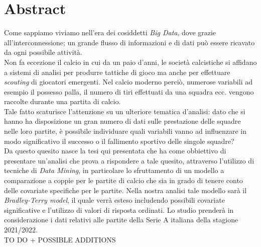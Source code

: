 
\cleardoublepage
{}
{}
\begingroup
\let\clearpage\relax
\let\cleardoublepage\relax
\let\cleardoublepage\relax

\chapter*{Abstract}

Come sappiamo viviamo nell'era dei cosiddetti \emph{Big Data}, dove grazie all'interconnessione; un grande flusso di informazioni e di dati può essere ricavato da ogni possibile attività. \\
Non fa eccezione il calcio in cui da un paio d'anni, le società calcistiche si affidano a sistemi di analisi per produrre tattiche di gioco ma anche per effettuare \textit{scouting} di giocatori emergenti. Nel calcio moderno perciò, numerose variabili ad esempio il possesso palla, il numero di tiri effettuati da una squadra ecc. vengono raccolte durante una partita di calcio.\\
Tale fatto scaturisce l'attenzione su un ulteriore tematica d'analisi: dato che si hanno ha disposizione un gran numero di dati sulle prestazione delle squadre nelle loro partite, è possibile individuare quali variabili vanno ad influenzare in modo significativo il successo o il fallimento sportivo delle singole squadre?\\
Da questo quesito nasce la tesi qui presentata che ha come obbiettivo di presentare un'analisi che prova a rispondere a tale quesito, attraverso l'utilizzo di tecniche di \textit{Data Mining}, in particolare lo sfruttamento di un modello a comparazione a coppie per le partite di calcio che sia in grado di tenere conto delle covariate specifiche per le partite. Nella nostra analisi tale modello sarà il \emph{Bradley-Terry model}, il quale verrà esteso includendo possibili covariate significative e l'utilizzo di valori di risposta ordinati. Lo studio prenderà in considerazione i dati relativi alle partite della Serie A italiana della stagione 2021/2022.\\
TO DO + POSSIBLE ADDITIONS






%
%

\endgroup			

\vfill

